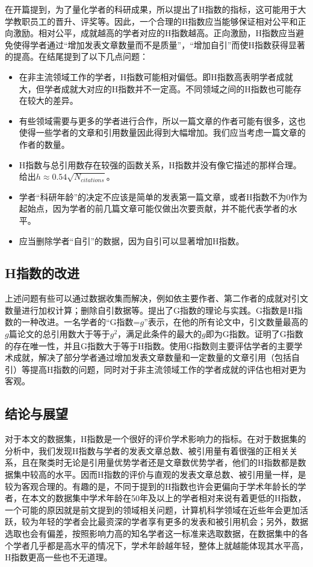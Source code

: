 \documentclass[lang=cn,11pt,a4paper,cite=authoryear]{elegantpaper}
\begin{document}
\cite{Hirsch16569}在开篇提到，为了量化学者的科研成果，所以提出了H指数的指标，这可能用于大学教职员工的晋升、评奖等。因此，一个合理的H指数应当能够保证相对公平和正向激励。相对公平，成就越高的学者对应的H指数越高。正向激励，H指数应当避免使得学者通过“增加发表文章数量而不是质量”，“增加自引”而使H指数获得显著的提高。\cite{Hirsch16569}在结尾提到了以下几点问题：

\begin{itemize}
	\item 在非主流领域工作的学者，H指数可能相对偏低。即H指数高表明学者成就大，但学者成就大对应的H指数并不一定高。不同领域之间的H指数也可能存在较大的差异。
	\item 有些领域需要与更多的学者进行合作，所以一篇文章的作者可能有很多，这也使得一些学者的文章和引用数量因此得到大幅增加。我们应当考虑一篇文章的作者的数量。
	\item H指数与总引用数存在较强的函数关系，H指数并没有像它描述的那样合理。\cite{Alex}给出$h \approx 0.54 \sqrt{N_{citations}}$。
	\item 学者“科研年龄”的决定不应该是简单的发表第一篇文章，或者H指数不为0作为起始点，因为学者的前几篇文章可能仅做出次要贡献，并不能代表学者的水平。
	\item 应当删除学者“自引”的数据，因为自引可以显著增加H指数。
\end{itemize}

\subsection{H指数的改进}

上述问题有些可以通过数据收集而解决，例如依主要作者、第二作者的成就对引文数量进行加权计算；删除自引数据等。\cite{Egghe2006}提出了G指数的理论与实践。G指数是H指数的一种改进。一名学者的“G指数=$g$”表示，在他的所有论文中，引文数量最高的$g$篇论文的总引用数大于等于$g^2$，满足此条件的最大的$g$即为G指数。\cite{Egghe2006}证明了G指数的存在唯一性，并且G指数大于等于H指数。使用G指数则主要评估学者的主要学术成就，解决了部分学者通过增加发表文章数量和一定数量的文章引用（包括自引）等提高H指数的问题，同时对于非主流领域工作的学者成就的评估也相对更为客观。

\subsection{结论与展望}

对于本文的数据集，H指数是一个很好的评价学术影响力的指标。在对于数据集的分析中，我们发现H指数与学者的发表文章总数、被引用量有着很强的正相关关系，且在聚类时无论是引用量优势学者还是文章数优势学者，他们的H指数都是数据集中较高的水平。因而H指数的评价与直观的发表文章总数、被引用量一样，是较为客观合理的。有趣的是，不同于\cite{Hirsch16569}提到的H指数也许会更偏向于学术年龄长的学者，在本文的数据集中学术年龄在50年及以上的学者相对来说有着更低的H指数，一个可能的原因就是前文提到的领域相关问题，计算机科学领域在近些年会更加活跃，较为年轻的学者会比最资深的学者享有更多的发表和被引用机会；另外，数据选取也会有偏差，按照影响力高的知名学者这一标准来选取数据，在数据集中的各个学者几乎都是高水平的情况下，学术年龄越年轻，整体上就越能体现其水平高，H指数更高一些也不无道理。
\end{document}
